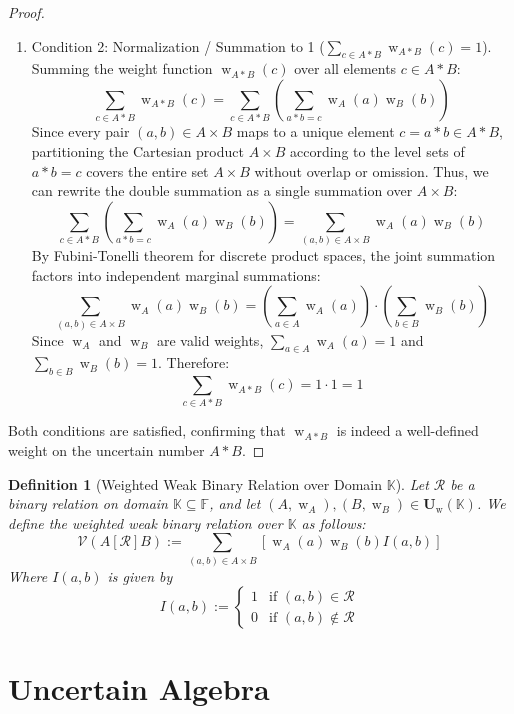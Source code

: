 \documentclass[a4paper,12pt,twoside]{memoir}
\newtheorem{definition}{Definition}[chapter]
\DeclareMathOperator{\w}{w}
\newcommand{\tsbdts}[1]{\mathbf{U}_{\w}(\mathbb{#1})} %
\newcommand{\ddclmd}{\mathcal{V}} %
\newcommand{\ts}[1]{\w_{#1}} %
\begin{document}
\begin{proof}
\begin{enumerate}[leftmargin=*]
			\item Condition 2: Normalization / Summation to 1 ($\sum_{c \in A*B} \ts{A*B}(c) = 1$). \\
			Summing the weight function $\ts{A*B}(c)$ over all elements $c \in A * B$:
			\[
			\sum_{c \in A*B} \ts{A*B}(c) = \sum_{c \in A*B} \left( \sum_{a*b=c} \ts{A}(a)\ts{B}(b) \right)
			\]
			Since every pair $(a, b) \in A \times B$ maps to a unique element $c = a * b \in A * B$, partitioning the Cartesian product $A \times B$ according to the level sets of $a * b = c$ covers the entire set $A \times B$ without overlap or omission. Thus, we can rewrite the double summation as a single summation over $A \times B$:
			\[
			\sum_{c \in A*B} \left( \sum_{a*b=c} \ts{A}(a)\ts{B}(b) \right) = \sum_{(a, b) \in A \times B} \ts{A}(a)\ts{B}(b)
			\]
			By Fubini-Tonelli theorem for discrete product spaces, the joint summation factors into independent marginal summations:
			\[
			\sum_{(a, b) \in A \times B} \ts{A}(a)\ts{B}(b) = \left( \sum_{a \in A} \ts{A}(a) \right) \cdot \left( \sum_{b \in B} \ts{B}(b) \right)
			\]
			Since $\ts{A}$ and $\ts{B}$ are valid weights, $\sum_{a \in A} \ts{A}(a) = 1$ and $\sum_{b \in B} \ts{B}(b) = 1$. Therefore:
			\[
			\sum_{c \in A*B} \ts{A*B}(c) = 1 \cdot 1 = 1
			\]
		\end{enumerate}
		
		Both conditions are satisfied, confirming that $\ts{A*B}$ is indeed a well-defined weight on the uncertain number $A * B$.
	\end{proof}
	\begin{definition}[Weighted Weak Binary Relation over Domain $\mathbb{K}$]
		Let $\mathcal{R}$ be a binary relation on domain $\mathbb{K} \subseteq \mathbb{F}$, and let $(A,\ts{A}),(B,\ts{B}) \in \tsbdts{K}$. We define the weighted weak binary relation over $\mathbb{K}$ as follows:
		\[\ddclmd(A[\mathcal{R}]B) := \sum_{(a,b) \in A \times B}{\left[\ts{A}(a)\ts{B}(b)I(a,b)\right]}\]
		Where $I(a,b)$ is given by
		\[
		I(a,b) := \begin{cases}
			1 & \text{if } (a,b) \in \mathcal{R}    \\
			0 & \text{if } (a,b) \notin \mathcal{R}
		\end{cases}
		\]
	\end{definition}
	
	\chapter{Uncertain Algebra}
	
\end{document}
